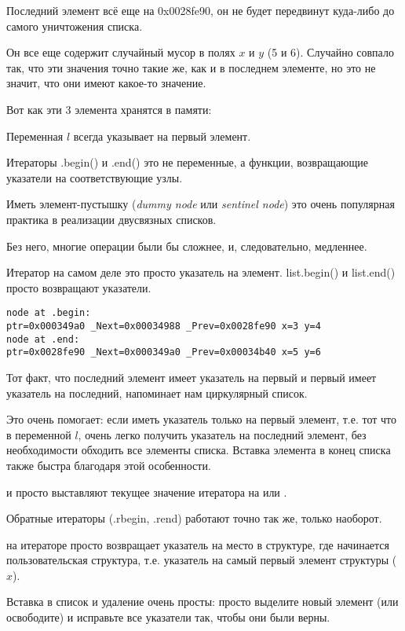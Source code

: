 Последний элемент всё еще на 0x0028fe90, 
он не будет передвинут куда-либо до самого уничтожения списка.

Он все еще содержит случайный мусор в полях $x$ и $y$ (5 и 6). 
Случайно совпало так, что эти значения точно такие же, как и в последнем элементе, но это не значит,
что они имеют какое-то значение.

Вот как эти 3 элемента хранятся в памяти:



Переменная $l$ всегда указывает на первый элемент.

Итераторы .begin() и .end() это не переменные, а функции,
возвращающие указатели на соответствующие узлы.

Иметь элемент-пустышку (\emph{dummy node} или \emph{sentinel node}) это очень популярная практика в реализации двусвязных списков.%

Без него, многие операции были бы сложнее, и, следовательно, медленнее.

Итератор на самом деле это просто указатель на элемент.
list.begin() и list.end() просто возвращают указатели.

\begin{lstlisting}
node at .begin:
ptr=0x000349a0 _Next=0x00034988 _Prev=0x0028fe90 x=3 y=4
node at .end:
ptr=0x0028fe90 _Next=0x000349a0 _Prev=0x00034b40 x=5 y=6
\end{lstlisting}

Тот факт, что последний элемент имеет указатель на первый 
и первый имеет указатель на последний, напоминает нам циркулярный список.

Это очень помогает: если иметь указатель только на первый элемент, т.е.
тот что в переменной $l$, очень легко получить указатель на последний элемент, без необходимости
обходить все элементы списка.
Вставка элемента в конец списка также быстра благодаря этой особенности.

 и  просто выставляют текущее значение итератора на  или .

Обратные итераторы (.rbegin, .rend) работают точно так же, только наоборот.

 на итераторе просто возвращает указатель на место в структуре, где начинается пользовательская
структура, т.е. указатель на самый первый элемент структуры ($x$).

Вставка в список и удаление очень просты: просто выделите новый элемент (или освободите) и исправьте
все указатели так, чтобы они были верны.

